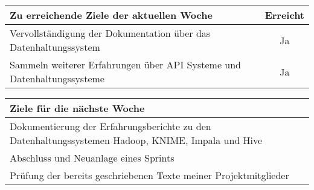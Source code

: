 \begin{tabularx}{\textwidth}{Xc}
    \arrayrulecolor{OliveGreen}
    \toprule
    {\bfseries Zu erreichende Ziele der aktuellen Woche} & {\bfseries Erreicht} \\
    \midrule[2pt]
    Vervollständigung der Dokumentation über das Datenhaltungssystem  &  Ja  \\
    \rowcolor{OliveGreen!15}
    Sammeln weiterer Erfahrungen über API Systeme und
    Datenhaltungssysteme  &  Ja  \\
    \bottomrule[2pt]
\end{tabularx}
%
\vspace{1cm}
%
\begin{tabularx}{\textwidth}{Xc}
    \arrayrulecolor{OliveGreen}
    \toprule
    {\bfseries Ziele für die nächste Woche}              &                      \\
    \midrule[2pt]
    Dokumentierung der Erfahrungsberichte zu den Datenhaltungssystemen Hadoop,
    KNIME, Impala und Hive  \\
    \rowcolor{OliveGreen!15}
    Abschluss und Neuanlage eines Sprints  \\
    \rowcolor{White}
    Prüfung der bereits geschriebenen Texte meiner Projektmitglieder  \\
\end{tabularx}
